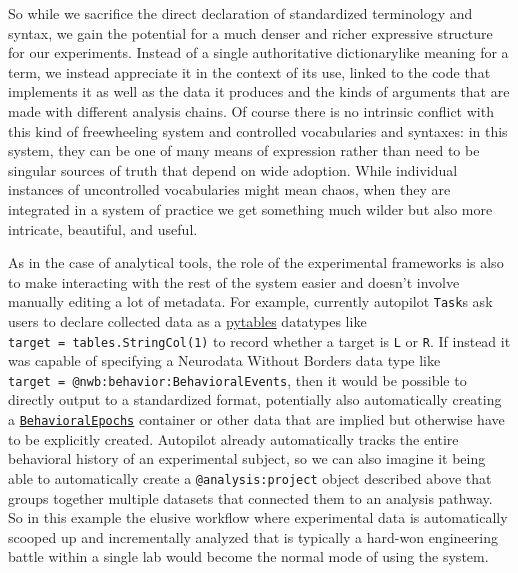 \documentclass[10pt]{article}
\begin{document}
\begin{multicols}{2}
So while we sacrifice the direct declaration of standardized terminology
and syntax, we gain the potential for a much denser and richer
expressive structure for our experiments. Instead of a single
authoritative dictionarylike meaning for a term, we instead appreciate
it in the context of its use, linked to the code that implements it as
well as the data it produces and the kinds of arguments that are made
with different analysis chains. Of course there is no intrinsic conflict
with this kind of freewheeling system and controlled vocabularies and
syntaxes: in this system, they can be one of many means of expression
rather than need to be singular sources of truth that depend on wide
adoption. While individual instances of uncontrolled vocabularies might
mean chaos, when they are integrated in a system of practice we get
something much wilder but also more intricate, beautiful, and useful.

As in the case of analytical tools, the role of the experimental
frameworks is also to make interacting with the rest of the system
easier and doesn't involve manually editing a lot of metadata. For
example, currently autopilot \texttt{Task}s ask users to declare
collected data as a \href{https://www.pytables.org/}{pytables} \cite{altedPyTablesProcessingAnalyzing2003}  datatypes like
\texttt{target\ =\ tables.StringCol(1)} to record whether a target is
\texttt{\textquotesingle{}L\textquotesingle{}} or
\texttt{\textquotesingle{}R\textquotesingle{}}. If instead it was
capable of specifying a Neurodata Without Borders data type like
\texttt{target\ =\ \textquotesingle{}@nwb:behavior:BehavioralEvents\textquotesingle{}},
then it would be possible to directly output to a standardized format,
potentially also automatically creating a
\href{https://pynwb.readthedocs.io/en/stable/pynwb.behavior.html\#pynwb.behavior.BehavioralEpochs}{\texttt{BehavioralEpochs}}
container or other data that are implied but otherwise have to be
explicitly created. Autopilot already automatically tracks the entire
behavioral history of an experimental subject, so we can also imagine it
being able to automatically create a \texttt{@analysis:project} object
described above that groups together multiple datasets that connected
them to an analysis pathway. So in this example the elusive workflow
where experimental data is automatically scooped up and incrementally
analyzed that is typically a hard-won engineering battle within a single
lab would become the normal mode of using the system.


\end{multicols}
\end{document}
